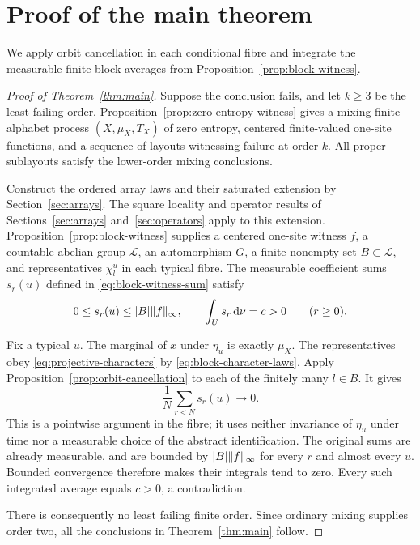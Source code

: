 \section{Proof of the main theorem}
\label{sec:main-proof}

We apply orbit cancellation in each conditional fibre and integrate the
measurable finite-block averages from Proposition~\ref{prop:block-witness}.

\begin{proof}[Proof of Theorem~\ref{thm:main}]
Suppose the conclusion fails, and let $k\ge3$ be the least failing order.
Proposition~\ref{prop:zero-entropy-witness} gives a mixing finite-alphabet
process $(X,\mu_X,T_X)$ of zero entropy, centered finite-valued one-site
functions, and a sequence of layouts witnessing failure at order $k$.
All proper sublayouts satisfy the lower-order mixing conclusions.

Construct the ordered array laws and their saturated extension by
Section~\ref{sec:arrays}. The square locality and operator results of
Sections~\ref{sec:arrays} and~\ref{sec:operators} apply to this extension.
Proposition~\ref{prop:block-witness} supplies a centered one-site witness
$f$, a countable abelian group $\mathcal L$, an automorphism $G$, a finite
nonempty set $B\subset\mathcal L$, and representatives $\chi_l^u$ in each
typical fibre. The measurable coefficient sums $s_r(u)$ defined in
\eqref{eq:block-witness-sum} satisfy
\[
 0\le s_r(u)\le |B|\lVert f\rVert_\infty,
 \qquad \int_U s_r\,\mathrm d\nu=c>0\qquad(r\ge0).
\]

Fix a typical $u$. The marginal of $x$ under $\eta_u$ is exactly $\mu_X$.
The representatives obey \eqref{eq:projective-characters} by
\eqref{eq:block-character-laws}. Apply
Proposition~\ref{prop:orbit-cancellation} to each of the finitely many
$l\in B$. It gives
\[
 \frac1N\sum_{r<N}s_r(u)\longrightarrow0.
\]
This is a pointwise argument in the fibre; it uses neither invariance of
$\eta_u$ under time nor a measurable choice of the abstract identification.
The original sums are already measurable, and are bounded by
$|B|\lVert f\rVert_\infty$ for every $r$ and almost every $u$.
Bounded convergence therefore makes their integrals tend to zero.
Every such integrated average equals $c>0$, a contradiction.

There is consequently no least failing finite order. Since ordinary
mixing supplies order two, all the conclusions in
Theorem~\ref{thm:main} follow.
\end{proof}
